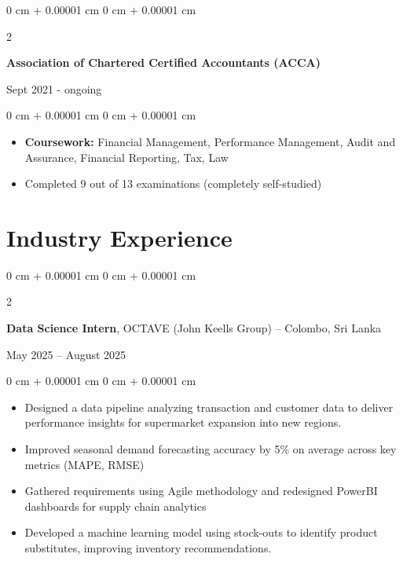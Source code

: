 \documentclass[10 pt,letterpaper]{article}
\newenvironment{highlights}{
    \begin{itemize}[
        topsep=0.10 cm,
        parsep=0.10 cm,
        partopsep=0pt,
        itemsep=0pt,
        leftmargin=0 cm + 10pt
    ]
}{
    \end{itemize}
} %
\newenvironment{onecolentry}{
    \begin{adjustwidth}{
        0 cm + 0.00001 cm
    }{
        0 cm + 0.00001 cm
    }
}{
    \end{adjustwidth}
} %
\newenvironment{twocolentry}[2][]{
    \onecolentry
    \def\secondColumn{#2}
    \setcolumnwidth{\fill, 4.5 cm}
    \begin{paracol}{2}
}{
    \switchcolumn \raggedleft \secondColumn
    \end{paracol}
    \endonecolentry
} %
\begin{document}
        
        \vspace{0.10 cm}
        \begin{twocolentry}
            {Sept 2021 - ongoing}
            \textbf{Association of Chartered Certified Accountants (ACCA)} 
        \end{twocolentry}
        \vspace{0.10 cm}
        \begin{onecolentry}
            \begin{highlights}
                \item \textbf{Coursework:} 
                Financial Management, 
                Performance Management, 
                Audit and Assurance,
                Financial Reporting,
                Tax,
                Law
                \item Completed 9 out of 13 examinations (completely self-studied)
            \end{highlights}
        \end{onecolentry}



    
    \section{Industry Experience}
        \begin{twocolentry}{
            May 2025 – August 2025
        }
            \textbf{Data Science Intern}, OCTAVE (John Keells Group) -- Colombo, Sri Lanka
        \end{twocolentry}

        \vspace{0.1 cm}
        \begin{onecolentry}
            \begin{highlights}
                \item Designed a data pipeline analyzing transaction and customer data to deliver performance insights for supermarket expansion into new regions.
                \item Improved seasonal demand forecasting accuracy by 5\% on average across key metrics (MAPE, RMSE)
                \item Gathered requirements using Agile methodology and redesigned PowerBI dashboards for supply chain analytics
                \item Developed a machine learning model using stock-outs to identify product substitutes, improving inventory recommendations.
            \end{highlights}
        \end{onecolentry}
\end{document}
